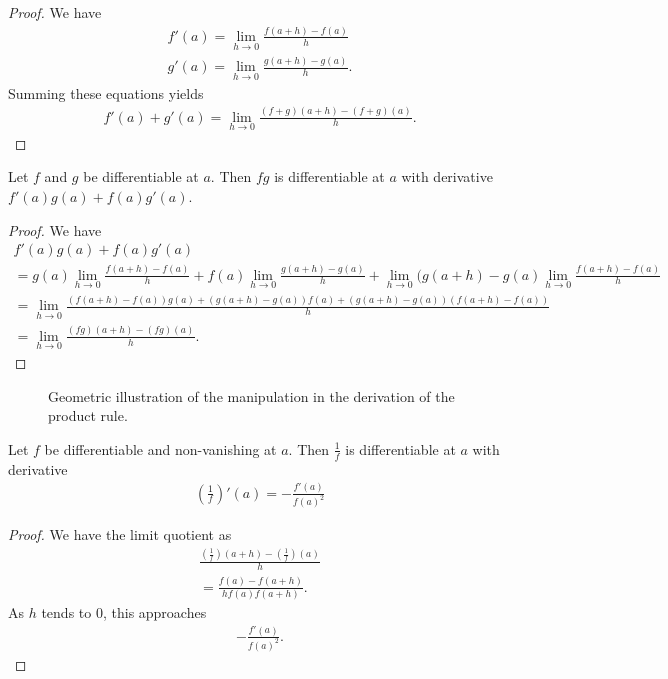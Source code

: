 \documentclass[]{article}
\begin{document}
\begin{proof}
		We have 
		\begin{align*}
				f'(a) = \lim_{h \to 0} \frac{f(a+h) - f(a)}{h} \\
				g'(a) = \lim_{h \to 0} \frac{g(a+h) - g(a)}{h}.
		\end{align*}
		Summing these equations yields
		\begin{align*}
				f'(a) + g'(a) = \lim_{h \to 0} \frac{(f+g)(a+h) - (f+g)(a)}{h}.
		\end{align*}
\end{proof}

\begin{thm} 
	Let $f$ and $g$ be differentiable at $a$. Then $fg$ is differentiable at $a$ with derivative $f'(a)g(a) + f(a)g'(a)$.
\end{thm}

\begin{proof}
	We have 
	\begin{align*}
			f'(a)g(a) + f(a)g'(a) \\
			= g(a) \lim_{h \to 0} \frac{f(a+h) - f(a)}{h} + f(a) \lim_{h \to 0} \frac{g(a+h) - g(a)}{h} + \lim_{h \to 0} (g(a+h) - g(a) \lim_{h \to 0} \frac{f(a+h) - f(a)}{h} \\
			= \lim_{h \to 0} \frac{(f(a+h) - f(a))g(a) + (g(a+h)-g(a))f(a) + (g(a+h)-g(a))(f(a+h)-f(a))}{h} \\
			= \lim_{h \to 0} \frac{(fg)(a+h) - (fg)(a)}{h}.
	\end{align*}
\end{proof}

\begin{figure}[ht]
\centering
{}
\caption{Geometric illustration of the manipulation in the derivation of the product rule.}
\label{fig:derivative-product-rule}
\end{figure}

\begin{thm}
		Let $f$ be differentiable and non-vanishing at $a$. Then $\frac{1}{f}$ is differentiable at $ a$ with derivative 
		\begin{align*}
				(\frac{1}{f})'(a) = -\frac{f'(a)}{f(a)^2}
		\end{align*}
\end{thm}

\begin{proof}
	We have the limit quotient as
	\begin{align*}
			\frac{(\frac{1}{f})(a+h) - (\frac{1}{f})(a)}{h} \\
			= \frac{f(a) - f(a+h)}{hf(a)f(a+h)}.
	\end{align*}
	As $h$ tends to  $0$, this approaches 
	\begin{align*}
			- \frac{f'(a)}{f(a)^2}.	
	\end{align*}
\end{proof}
\end{document}
